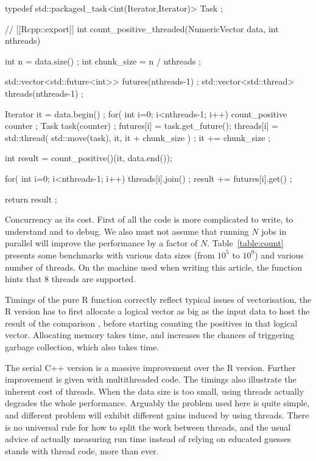 \begin{example}
typedef std::packaged_task<int(Iterator,Iterator)> Task ;

// [[Rcpp::export]]
int count_positive_threaded(NumericVector data, int nthreads){
  int n = data.size() ;
  int chunk_size = n / nthreads ; 
  
  std::vector<std::future<int>> futures(nthreads-1) ;
  std::vector<std::thread> threads(nthreads-1) ;
  
  Iterator it = data.begin() ;
  for( int i=0; i<nthreads-1; i++){
    count_positive counter ;        
    Task task(counter) ;
    futures[i] = task.get_future();
    threads[i] = std::thread( std::move(task), it, it + chunk_size ) ;
    it += chunk_size ;
  }
  
  int result = count_positive()(it, data.end()); 
  
  for( int i=0; i<nthreads-1; i++){
    threads[i].join() ;
    result += futures[i].get() ;  
  }
                            
  return result ;
}
\end{example}

Concurrency as its cost. First of all the code is more complicated
to write, to understand and to debug. We also must not assume that 
running $N$ jobs in parallel will improve the performance by a factor 
of $N$. Table~\ref{table:count} presents some benchmarks with various 
data sizes (from $10^5$ to $ 10^9$) and various number of threads. 
On the machine used when writing this article, 
the  function hints that 8 threads
are supported. 
           
Timings of the pure R function correctly reflect typical issues of 
vectorisation, the R version has to first allocate a logical vector
as big as the input data to host the result of the comparison , before
starting counting the positives in that logical vector. Allocating 
memory takes time, and increases the chances of triggering garbage collection, 
which also takes time. 

The serial C++ version is a massive improvement over the R version. Further 
improvement is given with multithreaded code. The timings also illustrate 
the inherent cost of threads. When the data size is too small, using threads
actually degrades the whole performance. Arguably the problem used here
is quite simple, and different problem will exhibit different gains 
induced by using threads. There is no universal rule for how to split
the work between threads, and the usual advice of actually measuring 
run time instead of relying on educated guesses stands with thread code, more than 
ever. 

